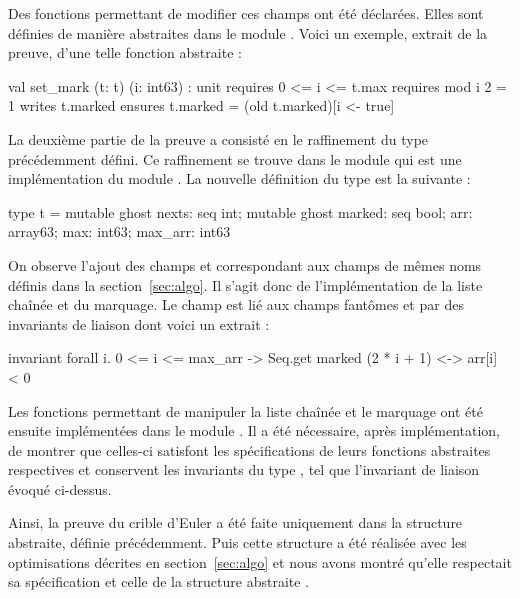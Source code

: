 \documentclass[a4paper]{easychair}
\begin{document}
Des fonctions permettant de modifier ces champs ont été déclarées.
Elles sont définies de manière abstraites dans le module .
Voici un exemple, extrait de la preuve, d'une telle fonction abstraite :
\begin{why3}
val set_mark (t: t) (i: int63) : unit
  requires { 0 <= i <= t.max }
  requires { mod i 2 = 1 }
  writes   { t.marked }
  ensures  { t.marked = (old t.marked)[i <- true] }
\end{why3}

\clearpage
La deuxième partie de la preuve a consisté en le raffinement du type 
précédemment défini. Ce raffinement se trouve dans le module
 qui est une implémentation du module .
La nouvelle définition du type  est la suivante :
\begin{why3}
type t = {
  mutable ghost nexts: seq int;
  mutable ghost marked: seq bool;
  arr: array63;
  max: int63;
  max_arr: int63
}
\end{why3}
On observe l'ajout des champs  et 
correspondant aux champs de mêmes noms définis dans la section~\ref{sec:algo}.
Il s'agit donc de l'implémentation de la liste chaînée et du marquage.
Le champ  est lié aux champs fantômes  et 
par des invariants de liaison dont voici un extrait :
\begin{why3}
invariant { forall i. 0 <= i <= max_arr ->
                 Seq.get marked (2 * i + 1) <-> arr[i] < 0 }
\end{why3}
Les fonctions permettant de manipuler la liste chaînée et le marquage ont été
ensuite implémen\-tées dans le module .
Il a été nécessaire, après implémentation, de montrer que celles-ci
satisfont les spécifications de leurs fonctions abstraites respectives et
conservent les invariants du type , tel que l'invariant de liaison
évoqué ci-dessus.

Ainsi, la preuve du crible d'Euler a été faite uniquement dans la
structure  abstraite, définie précédemment.
Puis cette structure  a été réalisée avec les optimisations
décrites en section~\ref{sec:algo} et nous avons montré qu'elle
respectait sa spécification et celle de la structure abstraite .
\end{document}
